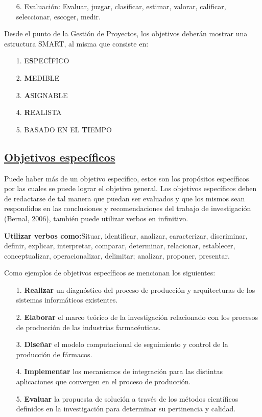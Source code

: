 \documentclass[12pt, a4paper, nofontenc, numbers=endperiod]{apa7}
\begin{document}
{{\begin{itemize}[leftmargin=1.70cm]
		\item[6.]	Evaluación: Evaluar, juzgar, clasificar, estimar, valorar, calificar, seleccionar, escoger, medir.
		
	\end{itemize}
}
	\setlength{\parindent}{1.27cm}Desde el punto de la Gestión de Proyectos, los objetivos deberán mostrar una estructura SMART, al misma que consiste en: 
{\doublespacing
	\begin{itemize}[leftmargin=1.70cm]
		\item[1.] 	E\textbf{S}PECÍFICO
		
		\item[2.]	\textbf{M}EDIBLE
		
		\item[3.]	\textbf{A}SIGNABLE
		
		\item[4.]	\textbf{R}EALISTA
		
		\item[5.]	BASADO EN EL \textbf{T}IEMPO	
	\end{itemize}
}
	\subsection*{\normalsize \underline{Objetivos específicos}} 
	\setlength{\parindent}{1.27cm}Puede haber más de un objetivo específico, estos son los propósitos específicos por las cuales se puede lograr el objetivo general. Los objetivos específicos deben de redactarse de tal manera que puedan ser evaluados y que los mismos sean respondidos en las conclusiones y recomendaciones del trabajo de investigación (Bernal, 2006), también puede utilizar verbos en infinitivo. 
	
	\textbf{Utilizar verbos como:}Situar, identificar, analizar, caracterizar, discriminar, definir, explicar, interpretar, comparar, determinar, relacionar, establecer, conceptualizar, operacionalizar, delimitar; analizar, proponer, presentar. 
	
	\setlength{\parindent}{1.27cm}Como ejemplos de objetivos específicos se mencionan los siguientes:
	
{\doublespacing
	\begin{itemize}[leftmargin=1.70cm]
		\item[1.]	\textbf{Realizar} un diagnóstico del proceso de producción y arquitecturas de los sistemas informáticos existentes.
		\item[2.]	\textbf{Elaborar} el marco teórico de la investigación relacionado con los procesos de producción de las industrias farmacéuticas.
		\item[3.]	\textbf{Diseñar} el modelo computacional de seguimiento y control de la producción de fármacos.
		\item[4.]	\textbf{Implementar} los mecanismos de integración para las distintas aplicaciones que convergen en el proceso de producción.
		\item[5.]	\textbf{Evaluar} la propuesta de solución a través de los métodos científicos definidos en la investigación para determinar su pertinencia y calidad.
	\end{itemize}
}
}
\end{document}
